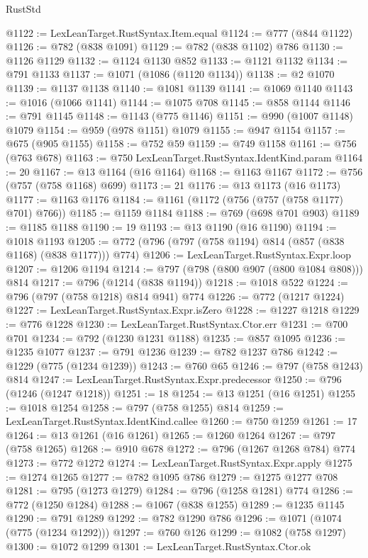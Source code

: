 \begin{lexlean}{RustStd}
\begin{coremodule}
@1122 := LexLeanTarget.RustSyntax.Item.equal
@1124 := @777 (@844 @1122)
@1126 := @782 (@838 @1091)
@1129 := @782 (@838 @1102) @786
@1130 := @1126 @1129
@1132 := @1124 @1130 @852
@1133 := @1121 @1132
@1134 := @791 @1133
@1137 := @1071 (@1086 (@1120 @1134))
@1138 := @2 @1070
@1139 := @1137 @1138
@1140 := @1081 @1139
@1141 := @1069 @1140
@1143 := @1016 (@1066 @1141)
@1144 := @1075 @708
@1145 := @858 @1144
@1146 := @791 @1145
@1148 := @1143 (@775 @1146)
@1151 := @990 (@1007 @1148) @1079
@1154 := @959 (@978 @1151) @1079
@1155 := @947 @1154
@1157 := @675 (@905 @1155)
@1158 := @752 @59
@1159 := @749 @1158
@1161 := @756 (@763 @678)
@1163 := @750 LexLeanTarget.RustSyntax.IdentKind.param
@1164 := 20
@1167 := @13 @1164 (@16 @1164)
@1168 := @1163 @1167
@1172 := @756 (@757 (@758 @1168) @699)
@1173 := 21
@1176 := @13 @1173 (@16 @1173)
@1177 := @1163 @1176
@1184 := @1161 (@1172 (@756 (@757 (@758 @1177) @701) @766))
@1185 := @1159 @1184
@1188 := @769 (@698 @701 @903)
@1189 := @1185 @1188
@1190 := 19
@1193 := @13 @1190 (@16 @1190)
@1194 := @1018 @1193
@1205 := @772 (@796 (@797 (@758 @1194) @814 (@857 (@838 @1168) (@838 @1177))) @774)
@1206 := LexLeanTarget.RustSyntax.Expr.loop
@1207 := @1206 @1194
@1214 := @797 (@798 (@800 @907 (@800 @1084 @808))) @814
@1217 := @796 (@1214 (@838 @1194))
@1218 := @1018 @522
@1224 := @796 (@797 (@758 @1218) @814 @941) @774
@1226 := @772 (@1217 @1224)
@1227 := LexLeanTarget.RustSyntax.Expr.isZero
@1228 := @1227 @1218
@1229 := @776 @1228
@1230 := LexLeanTarget.RustSyntax.Ctor.err
@1231 := @700 @701
@1234 := @792 (@1230 @1231 @1188)
@1235 := @857 @1095
@1236 := @1235 @1077
@1237 := @791 @1236
@1239 := @782 @1237 @786
@1242 := @1229 (@775 (@1234 @1239))
@1243 := @760 @65
@1246 := @797 (@758 @1243) @814
@1247 := LexLeanTarget.RustSyntax.Expr.predecessor
@1250 := @796 (@1246 (@1247 @1218))
@1251 := 18
@1254 := @13 @1251 (@16 @1251)
@1255 := @1018 @1254
@1258 := @797 (@758 @1255) @814
@1259 := LexLeanTarget.RustSyntax.IdentKind.callee
@1260 := @750 @1259
@1261 := 17
@1264 := @13 @1261 (@16 @1261)
@1265 := @1260 @1264
@1267 := @797 (@758 @1265)
@1268 := @910 @678
@1272 := @796 (@1267 @1268 @784) @774
@1273 := @772 @1272
@1274 := LexLeanTarget.RustSyntax.Expr.apply
@1275 := @1274 @1265
@1277 := @782 @1095 @786
@1279 := @1275 @1277 @708
@1281 := @795 (@1273 @1279)
@1284 := @796 (@1258 @1281) @774
@1286 := @772 (@1250 @1284)
@1288 := @1067 (@838 @1255)
@1289 := @1235 @1145
@1290 := @791 @1289
@1292 := @782 @1290 @786
@1296 := @1071 (@1074 (@775 (@1234 @1292)))
@1297 := @760 @126
@1299 := @1082 (@758 @1297)
@1300 := @1072 @1299
@1301 := LexLeanTarget.RustSyntax.Ctor.ok

\end{coremodule}
\end{lexlean}
